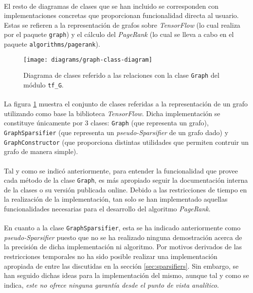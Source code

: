 \documentclass{subfiles}
\begin{document}
          \paragraph{}
          El resto de diagramas de clases que se han incluido se corresponden con implementaciones concretas que proporcionan funcionalidad directa al usuario. Estas se refieren a la representación de grafos sobre \emph{TensorFlow} (lo cual realiza por el paquete \texttt{graph}) y el cálculo del \emph{PageRank} (lo cual se lleva a cabo en el paquete \texttt{algorithms/pagerank}).

          \begin{figure}[h!]
            \centering
            \texttt{[image: diagrams/graph-class-diagram]}
            \caption{Diagrama de clases referido a las relaciones con la clase \texttt{Graph} del módulo \texttt{tf\_G}.}
            \label{img:graph_class_diagram}
          \end{figure}

          \paragraph{}
          La figura \ref{img:graph_class_diagram} muestra el conjunto de clases referidas a la representación de un grafo utilizando como base la biblioteca \emph{TensorFlow}. Dicha implementación se constituye únicamente por 3 clases: \texttt{Graph} (que representa un grafo), \texttt{GraphSparsifier} (que representa un \emph{pseudo-Sparsifier} de un grafo dado) y \texttt{GraphConstructor} (que proporciona distintas utilidades que permiten contruir un grafo de manera simple).

          \paragraph{}
          Tal y como se indicó anteriormente, para entender la funcionalidad que provee cada método de la clase \texttt{Graph}, es más apropiado seguir la documentación interna de la clases o su versión publicada online. Debido a las restricciones de tiempo en la realización de la implementación, tan solo se han implementado aquellas funcionalidades necesarias para el desarrollo del algoritmo \emph{PageRank}.

          \paragraph{}
          En cuanto a la clase \texttt{GraphSparsifier}, esta se ha indicado anteriormente como \emph{pseudo-Sparsifier} puesto que no se ha realizado ninguna demostración acerca de la precisión de dicha implementación ni algoritmo. Por motivos derivados de las restricciones temporales no ha sido posible realizar una implementación apropiada de entre las discutidas en la sección \ref{sec:sparsifiers}. Sin embargo, se han seguido dichas ideas para la implementación del mismo, aunque tal y como se indica, \emph{este no ofrece ninguna garantía desde el punto de vista analítico}.
\end{document}
